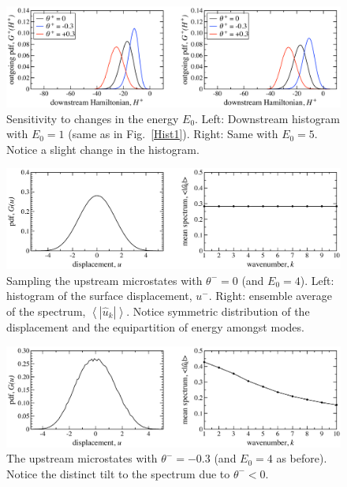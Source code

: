 \documentclass[12pt]{article}
\newcommand{\abs}[1]{\left| #1 \right|}
\newcommand{\mean}[1]{\left< #1 \right>}
\newcommand{\uhat}{\hat{u}}
\begin{document}
\begin{figure}[p]%
\begin{center}
\includegraphics[width = 0.8 \textwidth]{Hist3}
\caption{Sensitivity to changes in the energy $E_0$.
Left: Downstream histogram with $E_0 = 1$ (same as in Fig.~\ref{Hist1}). Right: Same with $E_0 = 5$. Notice a slight change in the histogram.}
\label{Hist3}
\end{center}
\end{figure}
 
\begin{figure}[p]%
\begin{center}
\includegraphics[width = 0.8 \textwidth]{microup0}
\caption{Sampling the upstream microstates with $\theta^- = 0$ (and $E_0 = 4$). Left: histogram of the surface displacement, $u^-$. Right: ensemble average of the spectrum, $\mean{\abs{\uhat_k}}$. Notice symmetric distribution of the displacement and the equipartition of energy amongst modes.}
\label{microup0}
\end{center}
\end{figure}
 
\begin{figure}[p]%
\begin{center}
\includegraphics[width = 0.8 \textwidth]{microup3}
\caption{The upstream microstates with $\theta^- = -0.3$ (and $E_0 = 4$ as before). Notice the distinct tilt to the spectrum due to $\theta^- < 0$.}
\label{microup3}
\end{center}
\end{figure}
 
\end{document}
